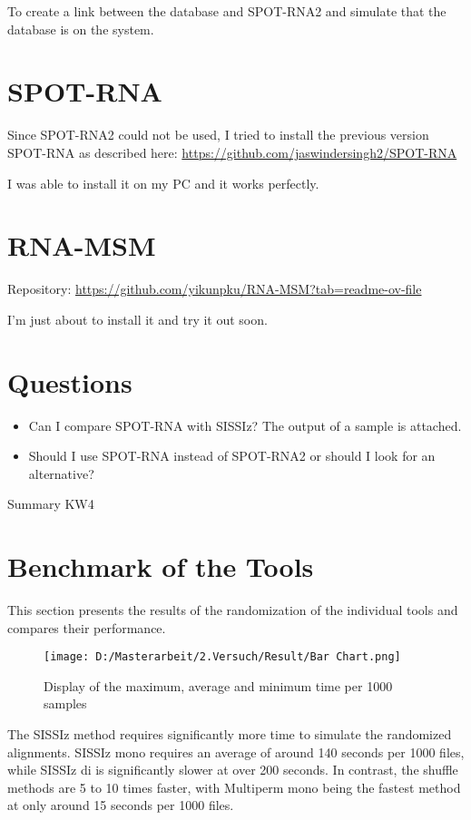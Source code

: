 \documentclass{article}
\begin{document}
\begin{large}
To create a link between the database and SPOT-RNA2 and simulate that the database is on the system.

\section{SPOT-RNA}

Since SPOT-RNA2 could not be used, I tried to install the previous version SPOT-RNA as described here:  
\url{https://github.com/jaswindersingh2/SPOT-RNA}

I was able to install it on my PC and it works perfectly. 

\section{RNA-MSM}

Repository:  
\url{https://github.com/yikunpku/RNA-MSM?tab=readme-ov-file}

I'm just about to install it and try it out soon.

\section{Questions}

\begin{itemize}
    \item Can I compare SPOT-RNA with SISSIz? The output of a sample is attached.
    \item Should I use SPOT-RNA instead of SPOT-RNA2 or should I look for an alternative?
\end{itemize}


Summary KW4

\section{Benchmark of the Tools}

This section presents the results of the randomization of the individual tools and compares their performance.


\begin{figure}[H]
    \centering
    \texttt{[image: D:/Masterarbeit/2.Versuch/Result/Bar Chart.png]}
    \caption{Display of the maximum, average and minimum time per 1000 samples}
\end{figure}


The SISSIz method requires significantly more time to simulate the randomized alignments. SISSIz mono requires an average of around 140 seconds per 1000 files, while SISSIz di is significantly slower at over 200 seconds. In contrast, the shuffle methods are 5 to 10 times faster, with Multiperm mono being the fastest method at only around 15 seconds per 1000 files.



\end{large}
\end{document}
